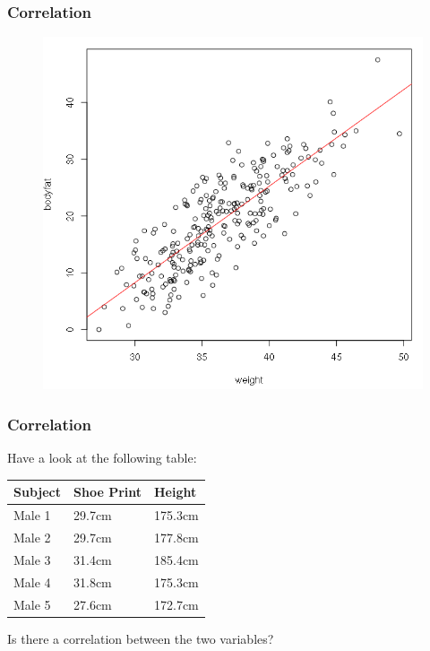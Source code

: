 \documentclass[xcolor=dvipsnames]{beamer}
\begin{document}
\begin{frame}
  \frametitle{Correlation}
\begin{figure}[h]
\includegraphics[scale=.35]{./diagrams/bf-03.png}
\end{figure}
\end{frame}

\begin{frame}
  \frametitle{Correlation}
  Have a look at the following table:

  \bigskip

  \begin{tabular}{|l|l|l|}\hline
    \textbf{Subject} & \textbf{Shoe Print} & \textbf{Height} \\ \hline
    Male 1 & 29.7cm & 175.3cm \\ \hline
    Male 2 & 29.7cm & 177.8cm \\ \hline
    Male 3 & 31.4cm & 185.4cm \\ \hline
    Male 4 & 31.8cm & 175.3cm \\ \hline
    Male 5 & 27.6cm & 172.7cm \\ \hline
  \end{tabular}

  \bigskip

  Is there a correlation between the two variables?
\end{frame}
\end{document}
